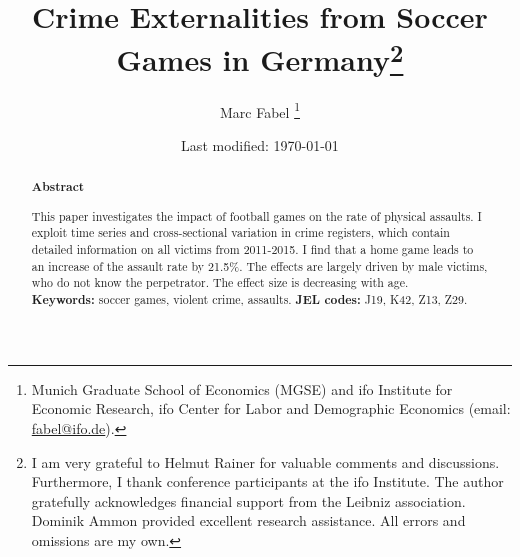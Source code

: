 \documentclass[11pt, a4paper]{article} %
\title{Crime Externalities from Soccer Games in Germany\footnote{I am very grateful to Helmut Rainer for valuable comments and discussions. Furthermore, I thank conference participants at the ifo Institute. The author gratefully acknowledges financial support from the Leibniz association. Dominik Ammon provided excellent research assistance. All errors and omissions are my own.
}}
\author{
	Marc Fabel 
		\thanks{Munich Graduate School of Economics (MGSE) and ifo Institute for Economic Research, ifo Center for Labor and Demographic Economics (email: \href{mailto:fabel@ifo.de}{fabel@ifo.de}).
		}
}
\date{Last modified: \today}
\begin{document}
\setcounter{page}{1}
\newpage

\maketitle
\vspace{-4 em}


\renewcommand{\abstractname}{\vspace{-\baselineskip}} %
\begin{abstract}\noindent 
	\footnotesize{\begin{center}\textbf{Abstract}\end{center} This paper investigates the impact of football games on the rate of physical assaults. I exploit time series and cross-sectional variation in crime registers, which contain detailed information on all victims from 2011-2015. I find that a home game leads to an increase of the assault rate by 21.5\%. The effects are largely driven by male victims, who do not know the perpetrator. The effect size is decreasing with age.
	\\\newline \textbf{Keywords:} soccer games, violent crime, assaults. \newline \textbf{JEL codes:} J19, K42, Z13, Z29.}

\end{abstract}







\vspace{2 em}
\end{document}
